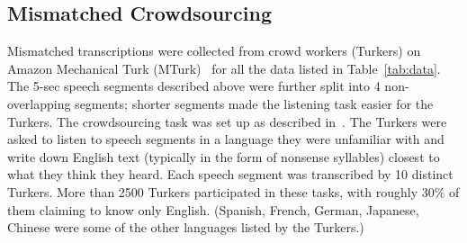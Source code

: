 
\subsection{Mismatched Crowdsourcing}

Mismatched transcriptions were collected from crowd workers (Turkers)
on Amazon Mechanical Turk (MTurk)~\cite{MTurk} for all the data listed
in Table~\ref{tab:data}.  The 5-sec speech segments described above
were further split into 4 non-overlapping segments; shorter segments
made the listening task easier for the Turkers. The crowdsourcing task
was set up as described in~\cite{JHJ15b}. The Turkers were asked to
listen to speech segments in a language they were unfamiliar with and
write down English text (typically in the form of nonsense syllables)
closest to what they think they heard. Each speech segment was
transcribed by 10 distinct Turkers. More than 2500 Turkers
participated in these tasks, with roughly 30\% of them claiming to
know only English. (Spanish, French, German, Japanese, Chinese were
some of the other languages listed by the Turkers.)

